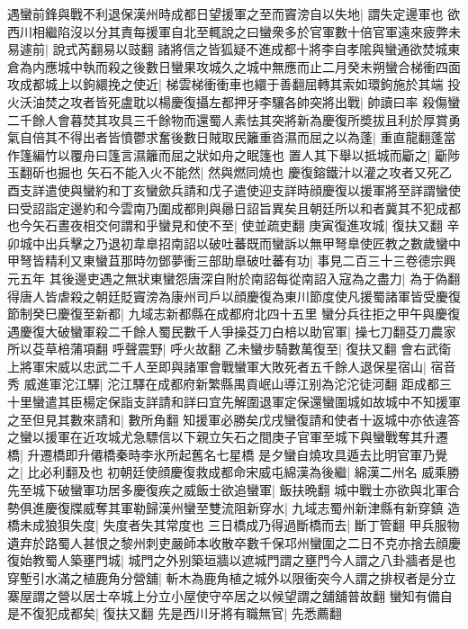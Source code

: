 遇蠻前鋒與戰不利退保漢州時成都日望援軍之至而竇滂自以失地|{
	謂失定邊軍也}
欲西川相繼陷沒以分其責每援軍自北至輒說之曰蠻衆多於官軍數十倍官軍遠來疲弊未易遽前|{
	說式芮翻易以豉翻}
諸將信之皆狐疑不進成都十將李自孝隂與蠻通欲焚城東倉為内應城中執而殺之後數日蠻果攻城久之城中無應而止二月癸未朔蠻合梯衝四面攻成都城上以鉤繯挽之使近|{
	梯雲梯衝衝車也繯于善翻屈轉其索如環鉤施於其端}
投火沃油焚之攻者皆死盧耽以楊慶復攝左都押牙李驤各帥突將出戰|{
	帥讀曰率}
殺傷蠻二千餘人會暮焚其攻具三千餘物而還蜀人素怯其突將新為慶復所奬拔且利於厚賞勇氣自倍其不得出者皆憤鬱求奮後數日賊取民籬重沓濕而屈之以為蓬|{
	重直龍翻蓬當作篷編竹以覆舟曰篷言濕籬而屈之狀如舟之眠篷也}
置人其下舉以抵城而斸之|{
	斸陟玉翻斫也掘也}
矢石不能入火不能然|{
	然與燃同燒也}
慶復鎔鐵汁以灌之攻者又死乙酉支詳遣使與蠻約和丁亥蠻歛兵請和戊子遣使迎支詳時顔慶復以援軍將至詳謂蠻使曰受詔詣定邊約和今雲南乃圍成都則與曏日詔旨異矣且朝廷所以和者冀其不犯成都也今矢石晝夜相交何謂和乎蠻見和使不至|{
	使並疏吏翻}
庚寅復進攻城|{
	復扶又翻}
辛卯城中出兵擊之乃退初韋臯招南詔以破吐蕃既而蠻訴以無甲弩臯使匠教之數歲蠻中甲弩皆精利又東蠻苴那時勿鄧夢衝三部助臯破吐蕃有功|{
	事見二百三十三卷德宗興元五年}
其後邊吏遇之無狀東蠻怨唐深自附於南詔每從南詔入寇為之盡力|{
	為于偽翻}
得唐人皆虐殺之朝廷貶竇滂為康州司戶以顔慶復為東川節度使凡援蜀諸軍皆受慶復節制癸巳慶復至新都|{
	九域志新都縣在成都府北四十五里}
蠻分兵往拒之甲午與慶復遇慶復大破蠻軍殺二千餘人蜀民數千人爭操芟刀白棓以助官軍|{
	操七刀翻芟刀農家所以芟草棓蒲項翻}
呼聲震野|{
	呼火故翻}
乙未蠻步騎數萬復至|{
	復扶又翻}
會右武衛上將軍宋威以忠武二千人至即與諸軍會戰蠻軍大敗死者五千餘人退保星宿山|{
	宿音秀}
威進軍沱江驛|{
	沱江驛在成都府新繁縣禺貢岷山導江别為沱沱徒河翻}
距成都三十里蠻遣其臣楊定保詣支詳請和詳曰宜先解圍退軍定保還蠻圍城如故城中不知援軍之至但見其數來請和|{
	數所角翻}
知援軍必勝矣戊戌蠻復請和使者十返城中亦依違答之蠻以援軍在近攻城尤急驃信以下親立矢石之間庚子官軍至城下與蠻戰奪其升遷橋|{
	升遷橋即升僊橋秦時李氷所起舊名七星橋}
是夕蠻自燒攻具遁去比明官軍乃覺之|{
	比必利翻及也}
初朝廷使顔慶復救成都命宋威屯綿漢為後繼|{
	綿漢二州名}
威乘勝先至城下破蠻軍功居多慶復疾之威飯士欲追蠻軍|{
	飯扶晩翻}
城中戰士亦欲與北軍合勢俱進慶復牒威奪其軍勒歸漢州蠻至雙流阻新穿水|{
	九域志蜀州新津縣有新穿鎮}
造橋未成狼狽失度|{
	失度者失其常度也}
三日橋成乃得過斷橋而去|{
	斷丁管翻}
甲兵服物遺弃於路蜀人甚恨之黎州刺吏嚴師本收散卒數千保邛州蠻圍之二日不克亦捨去顔慶復始教蜀人築壅門城|{
	城門之外别築垣牆以遮城門謂之壅門今人謂之八卦牆者是也}
穿塹引水滿之植鹿角分營舖|{
	斬木為鹿角植之城外以限衝突今人謂之排杈者是分立寨屋謂之營以居士卒城上分立小屋使守卒居之以候望謂之舖舖普故翻}
蠻知有備自是不復犯成都矣|{
	復扶又翻}
先是西川牙將有職無官|{
	先悉薦翻}
